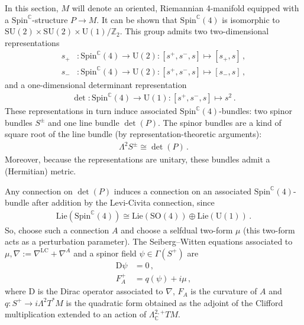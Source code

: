    In this section, $M$ will denote an oriented, Riemannian 4-manifold equipped with a $\mathrm{Spin}^{\mathbb{C}}$-structure $P\rightarrow M$. It can be shown that $\mathrm{Spin}^{\mathbb{C}}(4)$ is isomorphic to $\mathrm{SU}(2)\times\mathrm{SU}(2)\times\mathrm{U}(1)/\mathbb{Z}_2$. This group admits two two-dimensional representations
    \begin{align}
        s_+&:\mathrm{Spin}^{\mathbb{C}}(4)\rightarrow\mathrm{U}(2):[s^+,s^-,s]\mapsto[s_+,s]\,,\\
        s_-&:\mathrm{Spin}^{\mathbb{C}}(4)\rightarrow\mathrm{U}(2):[s^+,s^-,s]\mapsto[s_-,s]\,,
    \end{align}
    and a one-dimensional determinant representation
    \begin{gather}
        \det:\mathrm{Spin}^{\mathbb{C}}(4)\rightarrow\mathrm{U}(1):[s^+,s^-,s]\mapsto s^2\,.
    \end{gather}
    These representations in turn induce associated $\mathrm{Spin}^{\mathbb{C}}(4)$-bundles: two spinor bundles $S^\pm$ and one line bundle $\det(P)$. The spinor bundles are a kind of square root of the line bundle (by representation-theoretic arguments):
    \begin{gather}
        \Lambda^2S^\pm\cong\det(P)\,.
    \end{gather}
    Moreover, because the representations are unitary, these bundles admit a (Hermitian) metric.

    Any connection on $\det(P)$ induces a connection on an associated $\mathrm{Spin}^{\mathbb{C}}(4)$-bundle after addition by the Levi-Civita connection, since
    \begin{gather}
        \mathrm{Lie}(\mathrm{Spin}^{\mathbb{C}}(4))\cong\mathrm{Lie}(\mathrm{SO}(4))\oplus\mathrm{Lie}(\mathrm{U}(1))\,.
    \end{gather}
    So, choose such a connection $A$ and choose a selfdual two-form $\mu$ (this two-form acts as a perturbation parameter). The Seiberg--Witten equations associated to $\mu,\nabla:=\nabla^\mathrm{LC}+\nabla^A$ and a spinor field $\psi\in\Gamma(S^+)$ are
    \begin{align}
        \mathrm{D}\psi &= 0\,,\\
        F_A^+ &= q(\psi) + i\mu\,,\label{unification:sw2}
    \end{align}
    where $\mathrm{D}$ is the Dirac operator associated to $\nabla$, $F_A$ is the curvature of $A$ and $q:S^+\rightarrow i\Lambda^2T^*M$ is the quadratic form obtained as the adjoint of the Clifford multiplication extended to an action of $\Lambda^{2,+}_{\mathbb{C}}TM$.

